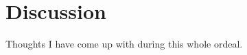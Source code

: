 \chapter{Discussion}
\label{chapter:discussion}

Thoughts I have come up with during this whole ordeal.